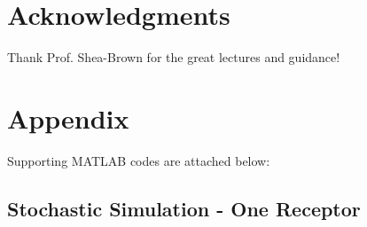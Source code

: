 \documentclass[fleqn,10pt]{wlscirep}
\begin{document}


\section*{Acknowledgments}

Thank Prof. Shea-Brown for the great lectures and guidance!

\section*{Appendix}

Supporting MATLAB codes are attached below:


\subsection*{Stochastic Simulation - One Receptor}
\end{document}

